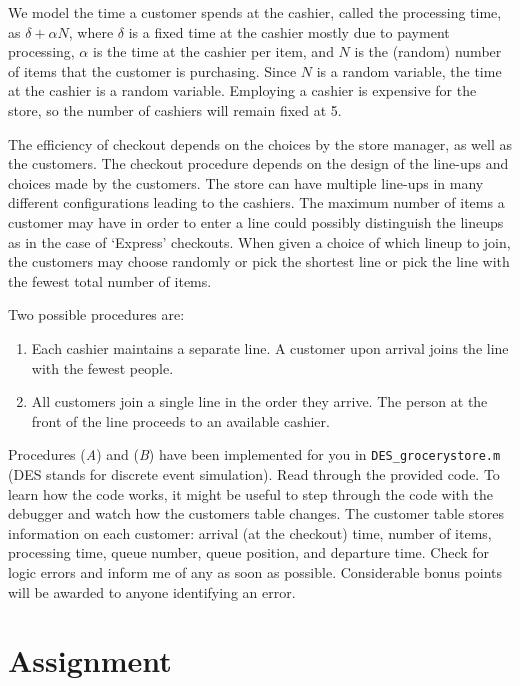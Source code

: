 \documentclass[letter]{article}
\begin{document}
We model the time a customer spends at the cashier, called the processing time, as $\delta + \alpha N$, where $\delta$ is a fixed time at the cashier mostly due to payment processing, $\alpha$ is the time at the cashier per item, and $N$ is the (random) number of items that the customer is purchasing. Since $N$ is a random variable, the time at the cashier is a random variable. Employing a cashier is expensive for the store, so the number of cashiers will remain fixed at 5.

The efficiency of checkout depends on the choices by the store manager, as well as the customers. The checkout procedure depends on the design of the line-ups and choices made by the customers. The store can have multiple line-ups in many different configurations leading to the cashiers. The maximum number of items a customer may have in order to enter a line could possibly distinguish the lineups as in the case of `Express' checkouts. When given a choice of which lineup to join, the customers may choose randomly or pick the shortest line or pick the line with the fewest total number of items.

Two possible procedures are:
\begin{enumerate}[label=(\textit{\Alph*})]
	\item Each cashier maintains a separate line. A customer upon arrival joins the line with the fewest people.
	\item All customers join a single line in the order they arrive. The person at the front of the line proceeds to an available cashier.
\end{enumerate}



Procedures (\textit{A}) and (\textit{B}) have been implemented for you in \verb|DES_grocerystore.m| (DES stands for discrete event simulation). Read through the provided code. To learn how the code works, it might be useful to step through the code with the debugger and watch how the customers table changes. The customer table stores information on each customer: arrival (at the checkout) time, number of items, processing time, queue number, queue position, and departure time. Check for logic errors and inform me of any as soon as possible. Considerable bonus points will be awarded to anyone identifying an error.

\section{Assignment}
\end{document}
